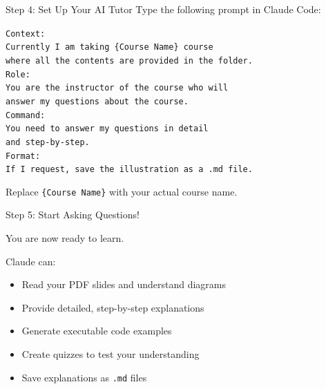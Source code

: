\documentclass[aspectratio=169,xcolor=dvipsnames]{beamer}
\begin{document}
\begin{frame}{Step 4: Set Up Your AI Tutor}
  Type the following prompt in Claude Code:

  \vspace{0.5em}
  \begin{center}
    \colorbox{codebg}{%
      \parbox{0.8\textwidth}{%
        \texttt{\textcolor{codegreen}{Context:}}\\
        \texttt{\textcolor{codetext}{Currently I am taking \{Course Name\} course}}\\
        \texttt{\textcolor{codetext}{where all the contents are provided in the folder.}}\\[4pt]
        \texttt{\textcolor{codegreen}{Role:}}\\
        \texttt{\textcolor{codetext}{You are the instructor of the course who will}}\\
        \texttt{\textcolor{codetext}{answer my questions about the course.}}\\[4pt]
        \texttt{\textcolor{codegreen}{Command:}}\\
        \texttt{\textcolor{codetext}{You need to answer my questions in detail}}\\
        \texttt{\textcolor{codetext}{and step-by-step.}}\\[4pt]
        \texttt{\textcolor{codegreen}{Format:}}\\
        \texttt{\textcolor{codetext}{If I request, save the illustration as a .md file.}}
      }%
    }
  \end{center}

  \vspace{0.5em}
  \small Replace \texttt{\{Course Name\}} with your actual course name.
\end{frame}

\begin{frame}{Step 5: Start Asking Questions!}
  \begin{center}
    {\Large You are now ready to learn.}
  \end{center}

  \vspace{1em}
  Claude can:
  \begin{itemize}
    \item Read your PDF slides and understand diagrams
    \item Provide detailed, step-by-step explanations
    \item Generate executable code examples
    \item Create quizzes to test your understanding
    \item Save explanations as \texttt{.md} files
  \end{itemize}
\end{frame}
\end{document}
